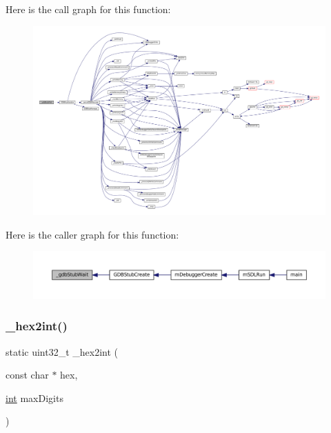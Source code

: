 Here is the call graph for this function\+:
\nopagebreak
\begin{figure}[H]
\begin{center}
\leavevmode
\includegraphics[width=350pt]{gdb-stub_8c_a611cb8cc4b4a1b0885f3d3a45487045b_cgraph}
\end{center}
\end{figure}
Here is the caller graph for this function\+:
\nopagebreak
\begin{figure}[H]
\begin{center}
\leavevmode
\includegraphics[width=350pt]{gdb-stub_8c_a611cb8cc4b4a1b0885f3d3a45487045b_icgraph}
\end{center}
\end{figure}
\mbox{\label{gdb-stub_8c_acc566acd6b2a0d699a29fc52811d345e}} 
\subsubsection{\texorpdfstring{\+\_\+hex2int()}{\_hex2int()}}
{\footnotesize\ttfamily static uint32\+\_\+t \+\_\+hex2int (\begin{DoxyParamCaption}\item[{const char $\ast$}]{hex,  }\item[{\mbox{\hyperlink{ioapi_8h_a787fa3cf048117ba7123753c1e74fcd6}{int}}}]{max\+Digits }\end{DoxyParamCaption})\hspace{0.3cm}{\ttfamily [static]}}

